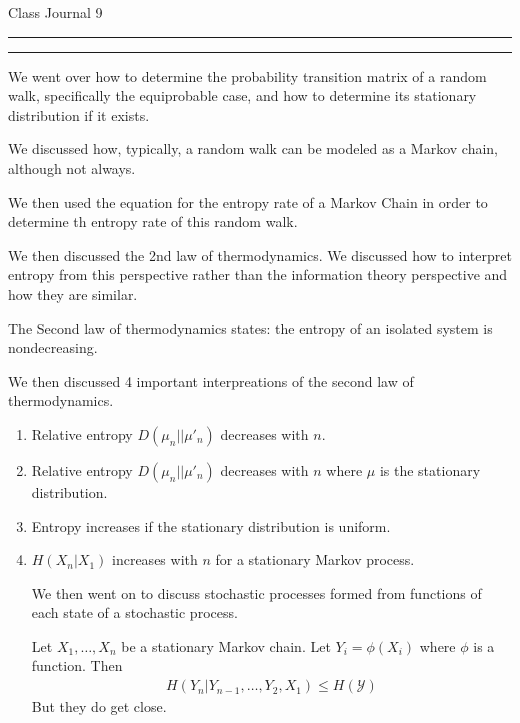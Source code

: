 \documentclass{article}
\newcounter{questionCounter}
\newcounter{partCounter}[questionCounter]
\newenvironment{question}[2][\arabic{questionCounter}]{%
    \setcounter{partCounter}{0}%
    \vspace{.25in} \hrule \vspace{0.5em}%
        \noindent{\bf \large#2}%
    \vspace{0.5em} \hrule \vspace{.10in}%
    \addtocounter{questionCounter}{1}%
}{}
\begin{document}
\begin{center}
{\Huge Class Journal 9}\\
\end{center}

\vspace{5mm}


\vspace{5mm}


\begin{question}{Main Theorems/Ideas in the lecture}
We went over how to determine the probability transition matrix of a random walk, specifically the equiprobable case, and how to determine its stationary distribution if it exists.

We discussed how, typically, a random walk can be modeled as a Markov chain, although not always.

We then used the equation for the entropy rate of a Markov Chain in order to determine th entropy rate of this random walk.

We then discussed the 2nd law of thermodynamics. We discussed how to interpret entropy from this perspective rather than the information theory perspective and how they are similar.

The Second law of thermodynamics states: the entropy of an isolated system is nondecreasing.

We then discussed 4 important interpreations of the second law of thermodynamics.
\begin{enumerate}
    \item Relative entropy $D(\mu_n || \mu'_n)$ decreases with $n$. 
    \item Relative entropy $D(\mu_n || \mu'_n)$ decreases with $n$ where $\mu$ is the stationary distribution.
    \item Entropy increases if the stationary distribution is uniform.
    \item $H(X_n|X_1)$ increases with $n$ for a stationary Markov process.

We then went on to discuss stochastic processes formed from functions of each state of a stochastic process.

Let $X_1, \ldots, X_n$ be a stationary Markov chain. Let $Y_i = \phi(X_i)$ where $\phi$ is a function. Then
\begin{gather*}
    H(Y_n|Y_{n-1}, \ldots, Y_2, X_1)\leq H(\mathcal{Y})
\end{gather*}
But they do get close. 


\end{enumerate}
\end{question}
\end{document}
